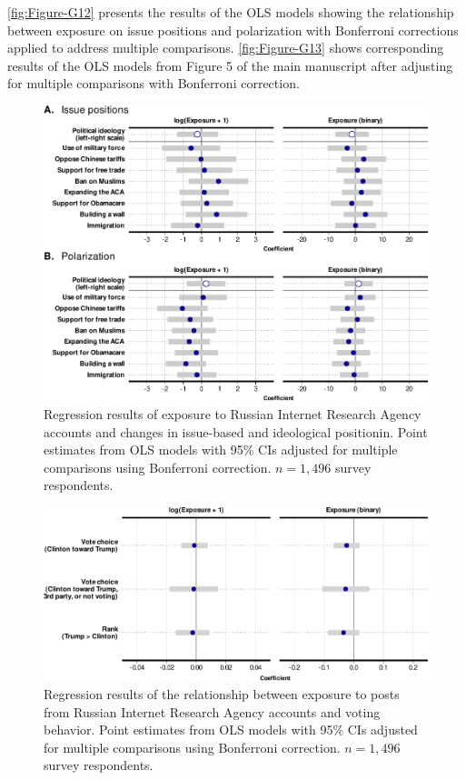 \documentclass[
  12pt,
]{article}
\begin{document}
\autoref{fig:Figure-G12} presents the results of the OLS models showing the relationship between exposure on issue positions and polarization with Bonferroni corrections applied to address multiple comparisons. \autoref{fig:Figure-G13} shows corresponding results of the OLS models from Figure 5 of the main manuscript after adjusting for multiple comparisons with Bonferroni correction.

\begin{figure}
\centering
\includegraphics{Appendix_files/figure-latex/Figure-G12-1.pdf}
\caption{\label{fig:Figure-G12}Regression results of exposure to Russian Internet Research Agency accounts and changes in issue-based and ideological positionin. Point estimates from OLS models with 95\% CIs adjusted for multiple comparisons using Bonferroni correction. \(n = 1,496\) survey respondents.}
\end{figure}

\begin{figure}
\centering
\includegraphics{Appendix_files/figure-latex/Figure-G13-1.pdf}
\caption{\label{fig:Figure-G13}Regression results of the relationship between exposure to posts from Russian Internet Research Agency accounts and voting behavior. Point estimates from OLS models with 95\% CIs adjusted for multiple comparisons using Bonferroni correction. \(n = 1,496\) survey respondents.}
\end{figure}
\end{document}
